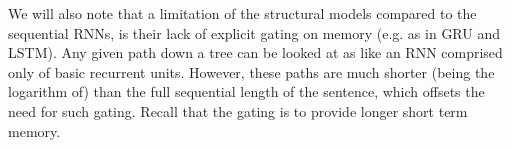 \documentclass[12pt,parskip]{komatufte}
\begin{document}
We will also note that a limitation of the structural models compared to the sequential RNNs,
is their lack of explicit gating on memory (e.g. as in GRU and LSTM).
Any given path down a tree can be looked at as like an RNN comprised only of basic recurrent units.
However, these paths are much shorter (being the logarithm of) than the full sequential length of the sentence,
which offsets the need for such gating.
Recall that the gating is to provide longer short term memory.
\end{document}

